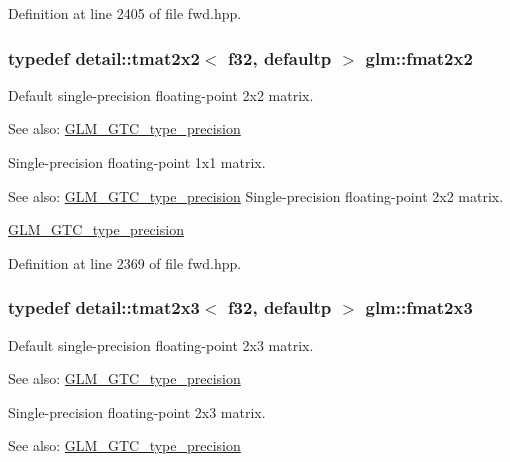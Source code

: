 Definition at line 2405 of file fwd.hpp.\hypertarget{group__gtc__type__precision_gda7823c23ae249dccaecb5a016c667f4}{
\subsubsection[fmat2x2]{\setlength{\rightskip}{0pt plus 5cm}typedef detail::tmat2x2$<$ f32, defaultp $>$ {\bf glm::fmat2x2}}}
\label{group__gtc__type__precision_gda7823c23ae249dccaecb5a016c667f4}


Default single-precision floating-point 2x2 matrix. \begin{Desc}
\item[See also:]\hyperlink{group__gtc__type__precision}{GLM\_\-GTC\_\-type\_\-precision}\end{Desc}
Single-precision floating-point 1x1 matrix. \begin{Desc}
\item[See also:]\hyperlink{group__gtc__type__precision}{GLM\_\-GTC\_\-type\_\-precision} Single-precision floating-point 2x2 matrix. 

\hyperlink{group__gtc__type__precision}{GLM\_\-GTC\_\-type\_\-precision} \end{Desc}


Definition at line 2369 of file fwd.hpp.\hypertarget{group__gtc__type__precision_g087d875cd4e384f101a28a4caf8ccd94}{
\subsubsection[fmat2x3]{\setlength{\rightskip}{0pt plus 5cm}typedef detail::tmat2x3$<$ f32, defaultp $>$ {\bf glm::fmat2x3}}}
\label{group__gtc__type__precision_g087d875cd4e384f101a28a4caf8ccd94}


Default single-precision floating-point 2x3 matrix. \begin{Desc}
\item[See also:]\hyperlink{group__gtc__type__precision}{GLM\_\-GTC\_\-type\_\-precision}\end{Desc}
Single-precision floating-point 2x3 matrix. \begin{Desc}
\item[See also:]\hyperlink{group__gtc__type__precision}{GLM\_\-GTC\_\-type\_\-precision} \end{Desc}


